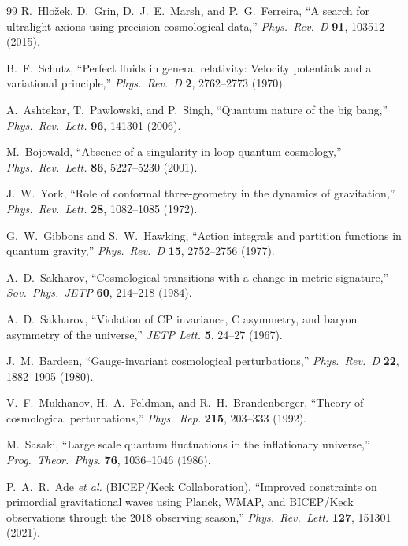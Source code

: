 \documentclass[11pt,a4paper]{article}
\theoremstyle{plain}
\theoremstyle{definition}
\theoremstyle{remark}
\numberwithin{equation}{section}
\begin{document}
\begin{thebibliography}{99}
R.~Hlo\v{z}ek, D.~Grin, D.~J.~E.~Marsh, and P.~G.~Ferreira, ``A search for ultralight axions using precision cosmological data,'' \textit{Phys.\ Rev.\ D} \textbf{91}, 103512 (2015).

B.~F.~Schutz, ``Perfect fluids in general relativity: Velocity potentials and a variational principle,'' \textit{Phys.\ Rev.\ D} \textbf{2}, 2762--2773 (1970).

A.~Ashtekar, T.~Pawlowski, and P.~Singh, ``Quantum nature of the big bang,'' \textit{Phys.\ Rev.\ Lett.} \textbf{96}, 141301 (2006).

M.~Bojowald, ``Absence of a singularity in loop quantum cosmology,'' \textit{Phys.\ Rev.\ Lett.} \textbf{86}, 5227--5230 (2001).

J.~W.~York, ``Role of conformal three-geometry in the dynamics of gravitation,'' \textit{Phys.\ Rev.\ Lett.} \textbf{28}, 1082--1085 (1972).

G.~W.~Gibbons and S.~W.~Hawking, ``Action integrals and partition functions in quantum gravity,'' \textit{Phys.\ Rev.\ D} \textbf{15}, 2752--2756 (1977).

A.~D.~Sakharov, ``Cosmological transitions with a change in metric signature,'' \textit{Sov.\ Phys.\ JETP} \textbf{60}, 214--218 (1984).

A.~D.~Sakharov, ``Violation of CP invariance, C asymmetry, and baryon asymmetry of the universe,'' \textit{JETP Lett.} \textbf{5}, 24--27 (1967).

J.~M.~Bardeen, ``Gauge-invariant cosmological perturbations,'' \textit{Phys.\ Rev.\ D} \textbf{22}, 1882--1905 (1980).

V.~F.~Mukhanov, H.~A.~Feldman, and R.~H.~Brandenberger, ``Theory of cosmological perturbations,'' \textit{Phys.\ Rep.} \textbf{215}, 203--333 (1992).

M.~Sasaki, ``Large scale quantum fluctuations in the inflationary universe,'' \textit{Prog.\ Theor.\ Phys.} \textbf{76}, 1036--1046 (1986).

P.~A.~R.~Ade \textit{et al.} (BICEP/Keck Collaboration), ``Improved constraints on primordial gravitational waves using Planck, WMAP, and BICEP/Keck observations through the 2018 observing season,'' \textit{Phys.\ Rev.\ Lett.} \textbf{127}, 151301 (2021).


\end{thebibliography}
\end{document}
